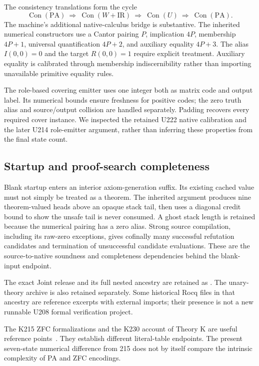 \documentclass[11pt,letterpaper]{article}
\newcommand{\PA}{\mathrm{PA}}
\newcommand{\Con}{\operatorname{Con}}
\newcommand{\IR}{\mathrm{IR}}
\newcommand{\art}[1]{\path{#1}}
\begin{document}
The consistency translations form the cycle
\[
\Con(\PA)\ \Longrightarrow\ \Con(W+\IR)\
\Longrightarrow\ \Con(U)\ \Longrightarrow\ \Con(\PA).
\]
The machine's additional native-calculus bridge is substantive. The
inherited numerical constructors use a Cantor pairing \(P\), implication
\(4P\), membership \(4P+1\), universal quantification \(4P+2\), and
auxiliary equality \(4P+3\). The alias \(I(0,0)=0\) and the target
\(R(0,0)=1\) require explicit treatment. Auxiliary equality is calibrated
through membership indiscernibility rather than importing unavailable
primitive equality rules.

The role-based covering emitter uses one integer both as matrix code and
output label. Its numerical bounds ensure freshness for positive codes;
the zero truth alias and source/output collision are handled separately.
Padding recovers every required cover instance. We inspected the retained U222 native
calibration and the later U214 role-emitter argument, rather than inferring
these properties from the final state count.

\subsection{Startup and proof-search completeness}

Blank startup enters an interior axiom-generation suffix. Its existing
cached value must not simply be treated as a theorem. The inherited
argument produces nine theorem-valued heads above an opaque stack tail,
then uses a diagonal credit bound to show the unsafe tail is never consumed.
A ghost stack length is retained because the numerical pairing has a zero
alias. Strong source compilation, including its raw-zero exceptions,
gives cofinally many successful refutation candidates and termination of
unsuccessful candidate evaluations. These are the source-to-native
soundness and completeness dependencies behind the blank-input endpoint.

The exact Joint release and its full nested ancestry are retained as
\art{baseline/U209_ConPA_Joint_2026-10-29.zip}. The unary-theory archive
is also retained separately. Some historical Rocq files in that ancestry
are reference excerpts with external imports; their presence is not a new
runnable U208 formal verification project.

The K215 ZFC formalizations and the K230 account of Theory K are useful
reference points~\cite{k215pa,k215formal,k230,m254}. They establish
different literal-table endpoints. The present seven-state numerical
difference from 215 does not by itself compare the intrinsic complexity
of PA and ZFC encodings.
\end{document}
